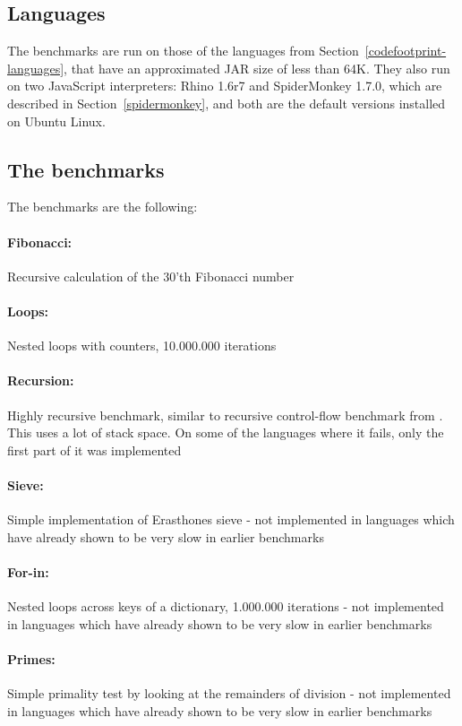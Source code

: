\documentclass[11pt]{report}
\begin{document}
\subsection{Languages}
The benchmarks are run on those of the languages from Section~\ref{codefootprint-languages}, that have an approximated JAR size of less than 64K. They also run on two JavaScript interpreters: Rhino 1.6r7 and SpiderMonkey 1.7.0, which are described in Section~\ref{spidermonkey}, and both are the default versions installed on Ubuntu Linux.

\subsection{The benchmarks}
The benchmarks are the following:

\paragraph{Fibonacci:} Recursive calculation of the 30'th Fibonacci number
\paragraph{Loops:} Nested loops with counters, 10.000.000 iterations
\paragraph{Recursion:} Highly recursive benchmark, similar to recursive control-flow benchmark from \cite{sunspider, shootout}. This uses a lot of stack space. On some of the languages where it fails, only the first part of it was implemented
\paragraph{Sieve:} Simple implementation of Erasthones sieve - not implemented in languages which have already shown to be very slow in earlier benchmarks
\paragraph{For-in:} Nested loops across keys of a dictionary, 1.000.000 iterations - not implemented in languages which have already shown to be very slow in earlier benchmarks
\paragraph{Primes:} Simple primality test by looking at the remainders of division - not implemented in languages which have already shown to be very slow in earlier benchmarks
\end{document}
